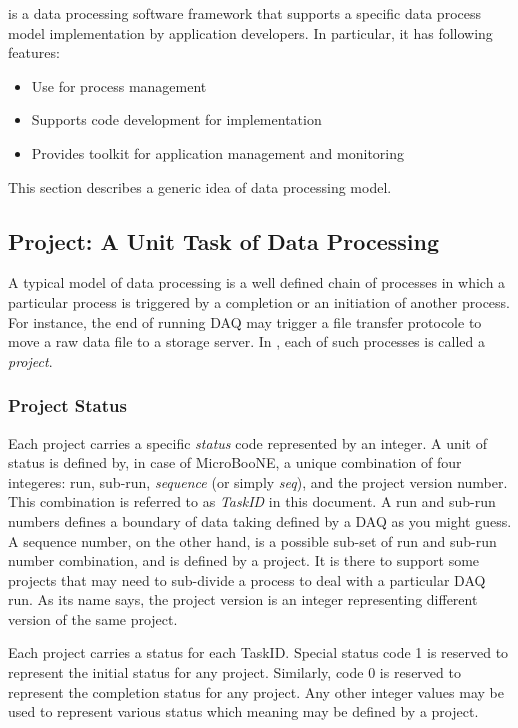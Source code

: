 
{\pubs} is a data processing software framework that supports a specific
data process model implementation by application developers. In particular,
it has following features:
\begin{itemize}
  \item Use {\psql} for process management
  \item Supports {\python} code development for implementation
  \item Provides {\php} toolkit for application management and monitoring
\end{itemize}
This section describes a generic idea of {\pubs} data processing model.

\subsection{Project: A Unit Task of Data Processing}
\label{pubs:model:project}
A typical model of data processing is a well defined chain of processes
in which a particular process is triggered by a completion or an initiation
of another process. For instance, the end of running DAQ may trigger a file
transfer protocole to move a raw data file to a storage server. In {\pubs},
each of such processes is called a {\it project}. 

\subsubsection{Project Status}
Each {\pubs} project carries a specific {\it status} code represented
by an integer. A unit of status is defined by, in case of MicroBooNE, a
unique combination of four integeres: run, sub-run, {\it sequence} 
(or simply {\it seq}), and the project version number. This combination is
referred to as {\it TaskID} in this document. A run and sub-run numbers 
defines a boundary of data taking  defined by a DAQ as you might guess. 
A sequence number, on the other hand, is a possible sub-set of run and 
sub-run number combination, and is defined by a project. It is there to 
support some projects that may need to sub-divide a process to deal with 
a particular DAQ run. As its name says, the project version is an integer
representing different version of the same project. 

Each {\pubs} project carries a status for each TaskID. Special status code 
1 is reserved to represent the initial status for any project. Similarly, 
code 0 is reserved to represent the completion status for any 
project. Any other integer values may be used to represent various status 
which meaning may be defined by a project.


